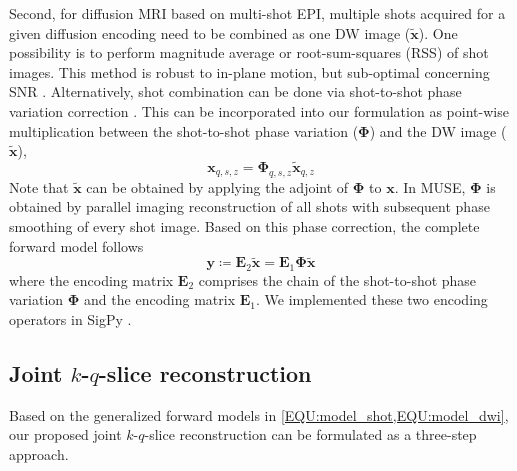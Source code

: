 \documentclass[preprint,12pt,authoryear,review]{elsarticle}
\begin{document}

    Second, for diffusion MRI based on multi-shot EPI,
    multiple shots acquired for a given diffusion encoding
    need to be combined as one DW image ($\mathbf{\tilde{x}}$).
    One possibility is to perform magnitude average
    \citep{chen_2013_muse}
    or root-sum-squares (RSS) \citep{mani_2017_mussels}
    of shot images.
    This method is robust to in-plane motion,
    but sub-optimal concerning SNR
    \citep{guhaniyogi_2016_amuse}.
    Alternatively, shot combination can be done
    via shot-to-shot phase variation correction
    \citep{liu_2005_moco_diff,chen_2013_muse}.
    This can be incorporated into our formulation
    as point-wise multiplication
    between the shot-to-shot phase variation ($\mathbf{\Phi}$) and
    the DW image ($\mathbf{\tilde{x}}$),
    \begin{equation}
         \mathbf{x}_{q,s,z} = \mathbf{\Phi}_{q,s,z} \mathbf{\tilde{x}}_{q,z}
    \end{equation}
    Note that $\mathbf{\tilde{x}}$ can be obtained
    by applying the adjoint of $\mathbf{\Phi}$ to $\mathbf{x}$.
    In MUSE, $\mathbf{\Phi}$ is obtained by parallel imaging reconstruction of all shots
    with subsequent phase smoothing of every shot image.
    Based on this phase correction, the complete forward model follows
    \begin{equation}
        \mathbf{y} \coloneqq \mathbf{E}_2 \mathbf{\tilde{x}} = \mathbf{E}_1 \mathbf{\Phi} \mathbf{\tilde{x}}
        \label{EQU:model_dwi}
    \end{equation}
    where the encoding matrix $\mathbf{E}_2$ comprises the chain of
    the shot-to-shot phase variation $\mathbf{\Phi}$ and
    the encoding matrix $\mathbf{E}_1$.
    We implemented these two encoding operators
    in SigPy \citep{ong_2019_sigpy}.


    \subsection{Joint $k$-$q$-slice reconstruction}
    \label{SUBSEC:JETS}

    Based on the generalized forward models in \cref{EQU:model_shot,EQU:model_dwi},
    our proposed joint $k$-$q$-slice reconstruction can be formulated as a three-step approach.
\end{document}
